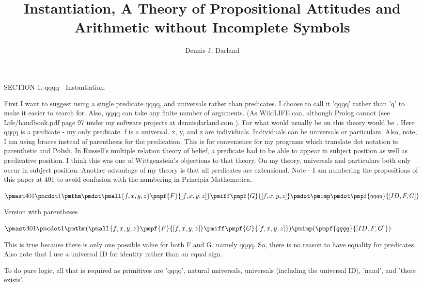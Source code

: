 \documentclass[12pt]{article}
\begin{document}
\title{Instantiation, A Theory of Propositional Attitudes and Arithmetic without Incomplete Symbols}
\author{Dennis J. Darland}
\maketitle

SECTION 1. qqqq - Instantiation.

First I want to suggest using a single predicate qqqq, and universals rather than predicates. I choose to call it 'qqqq' rather than 'q' to make it easier to
search for. Also, qqqq can take any finite number of arguments. (As WildLIFE can, although Prolog cannot (see Life/handbook.pdf page 97 under my software projects at dennisdarland.com ). For what would usually be  on this theory would be  . Here qqqq is a predicate - my only predicate. f is a universal. x, y, and z are individuals. Individuals can be universals or particulars. Also, note, I am using braces instead of parenthesis for the predication. This is for convenience for my programs which translate dot notation to parenthetic and Polish. In Russell's multiple relation theory of belief, a predicate had to be able to appear in subject position as well as predicative position. I think this was one of Wittgenstein's objections to that theory. On my theory, universals and particulars both only occur in subject position. Another advantage of my theory is that all predicates are extensional. Note - I am numbering the propositions of this paper at 401 to avoid confusion with the numbering in Principia Mathematica.

$\pmast 401 \pmcdot 1 \pmthm \pmdot \pmall{f, x, y, z} \pmpf{F}{[f,x,y,z]} \pmiff \pmpf{G}{[f,x,y,z]} \pmdot \pmimp \pmdot \pmpf{qqqq}{[ID,F,G]} $
 
 

Version with parentheses

$\pmast 401 \pmcdot 1 \pmthm  (  \pmall{f, x, y, z} \pmpf{F}{[f,x,y,z]} \pmiff \pmpf{G}{[f,x,y,z]}  ) \pmimp (  \pmpf{qqqq}{[ID,F,G]} )$


This is true because there is only one possible value for both F and G. namely qqqq. So, there is no reason to have equality for predicates. Also note that I use a universal ID for identity rather than an equal sign.

To do pure logic, all that is required as primitives are 'qqqq', natural universals, universals (including the universal ID), 'nand', and 'there exists'.  
\end{document}
